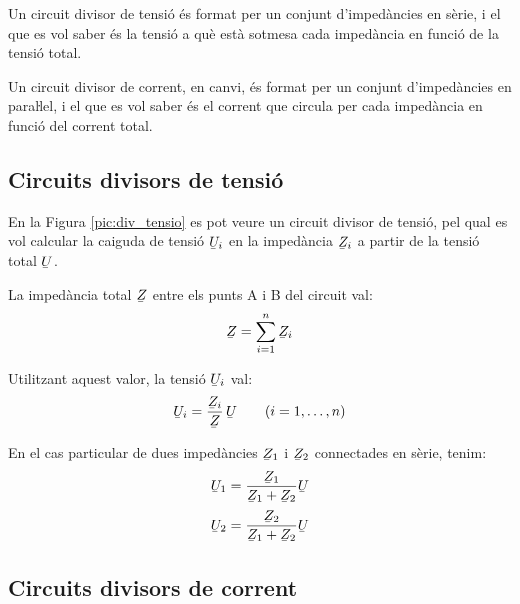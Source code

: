 Un circuit divisor de tensió és  format per un conjunt
d'impedàncies en sèrie, i el que es vol saber  és  la
tensió a què està sotmesa cada impedància en funció de la tensió total.

Un circuit divisor de corrent, en canvi, és format per un conjunt
d'impedàncies en paraŀlel, i el que es vol saber és el
corrent que circula per cada impedància en funció del corrent
total.

\subsection{Circuits divisors de tensió}\label{sec:circ-div-tens}

En la Figura \vref{pic:div_tensio} es pot veure un circuit divisor
de tensió, pel qual es vol calcular la caiguda de tensió
$\cmplx{U}_i$ en la impedància $\cmplx{Z}_i$ a partir de la tensió total $\cmplx{U}$.

\begin{center}
\centering
    
    \label{pic:div_tensio}
\end{center}

La impedància total $\cmplx{Z}$ entre els punts A i B del circuit val:
\begin{equation}\label{eq:z_serie}
    \cmplx{Z} = \sum_{i=1}^n \cmplx{Z}_i
\end{equation}

Utilitzant aquest valor, la tensió $\cmplx{U}_i$ val:
\begin{equation}
    \cmplx{U}_i = \frac{\cmplx{Z}_i}{\cmplx{Z}}\,\cmplx{U}\qquad (i=1,\dots,n)\label{eq:div_tensio}
\end{equation}

En el cas particular de dues impedàncies $\cmplx{Z}_1$ i $\cmplx{Z}_2$ connectades en sèrie, tenim:
\begin{subequations}
\begin{align}
    \cmplx{U}_1 &= \frac{\cmplx{Z}_1}{\cmplx{Z}_1+\cmplx{Z}_2} \cmplx{U}  \\[0.5ex]
    \cmplx{U}_2 &= \frac{\cmplx{Z}_2}{\cmplx{Z}_1+\cmplx{Z}_2} \cmplx{U}
\end{align}
\end{subequations}

\subsection{Circuits divisors de corrent}\label{sec:circ-div-corr}

